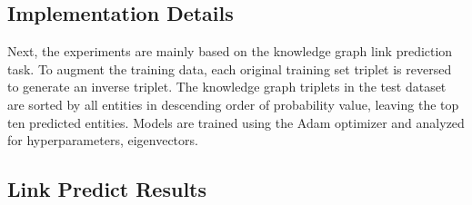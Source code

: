 \documentclass[10pt,journal,compsoc]{IEEEtran}
\begin{document}
\subsection{Implementation Details} 
Next, the experiments are mainly based on the knowledge graph link prediction task. To augment the training data, each original training set triplet is reversed to generate an inverse triplet. The knowledge graph triplets in the test dataset are sorted by all entities in descending order of probability value, leaving the top ten predicted entities. Models are trained using the Adam \cite{ref45} optimizer and analyzed for hyperparameters, eigenvectors.

\subsection{Link Predict Results}
\end{document}
